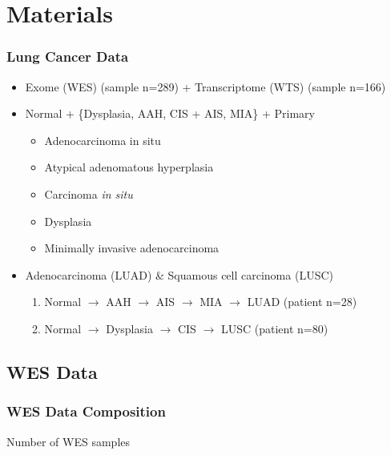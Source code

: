 \documentclass{beamer}
\begin{document}
    \section{Materials}
    \begin{frame}
        \frametitle{Lung Cancer Data}

        \begin{itemize}
            \item Exome (WES) (sample n=289) + Transcriptome (WTS) (sample n=166)
            \item Normal + \{Dysplasia, AAH, CIS + AIS, MIA\} + Primary
            \begin{itemize}
                \item Adenocarcinoma in situ
                \item Atypical adenomatous hyperplasia
                \item Carcinoma \textit{in situ}
                \item Dysplasia
                \item Minimally invasive adenocarcinoma
            \end{itemize}
            \item Adenocarcinoma (LUAD) \& Squamous cell carcinoma (LUSC)
            \begin{enumerate}
                \item Normal $\rightarrow$ AAH $\rightarrow$ AIS $\rightarrow$ MIA $\rightarrow$ LUAD (patient n=28)
                \item Normal $\rightarrow$ Dysplasia $\rightarrow$ CIS $\rightarrow$ LUSC (patient n=80)
            \end{enumerate}
        \end{itemize}
    \end{frame}

    \subsection{WES Data}
    \begin{frame}
        \frametitle{WES Data Composition}

        \begin{table}
            \caption{Number of WES samples}
            \resizebox{!}{0.3 \textheight}
            {}
        \end{table}
    \end{frame}
\end{document}

